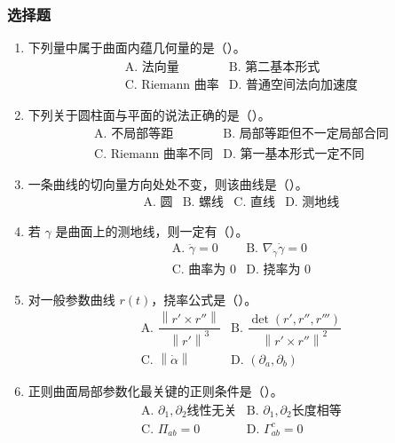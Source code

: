 \documentclass[UTF8,12pt,a4paper]{ctexart}
\newcommand{\norm}[1]{\left\lVert #1\right\rVert}
\begin{document}
\subsubsection*{选择题}
\begin{enumerate}
\item 下列量中属于曲面内蕴几何量的是（\quad）。
\[
\begin{array}{ll}
\text{A. 法向量} & \text{B. 第二基本形式}\\
\text{C. Riemann 曲率} & \text{D. 普通空间法向加速度}
\end{array}
\]

\item 下列关于圆柱面与平面的说法正确的是（\quad）。
\[
\begin{array}{ll}
\text{A. 不局部等距} & \text{B. 局部等距但不一定局部合同}\\
\text{C. Riemann 曲率不同} & \text{D. 第一基本形式一定不同}
\end{array}
\]

\item 一条曲线的切向量方向处处不变，则该曲线是（\quad）。
\[
\begin{array}{llll}
\text{A. 圆} & \text{B. 螺线} & \text{C. 直线} & \text{D. 测地线}
\end{array}
\]

\item 若 $\gamma$ 是曲面上的测地线，则一定有（\quad）。
\[
\begin{array}{ll}
\text{A. }\ddot\gamma=0 & \text{B. }\nabla_{\dot\gamma}\dot\gamma=0\\
\text{C. 曲率为 }0 & \text{D. 挠率为 }0
\end{array}
\]

\item 对一般参数曲线 $r(t)$，挠率公式是（\quad）。
\[
\begin{array}{ll}
\text{A. }\dfrac{\norm{r'\times r''}}{\norm{r'}^3} &
\text{B. }\dfrac{\det(r',r'',r''')}{\norm{r'\times r''}^2}\\
\text{C. }\norm{\dot\alpha} &
\text{D. }(\partial_a,\partial_b)
\end{array}
\]

\item 正则曲面局部参数化最关键的正则条件是（\quad）。
\[
\begin{array}{ll}
\text{A. }\partial_1,\partial_2\text{线性无关} &
\text{B. }\partial_1,\partial_2\text{长度相等}\\
\text{C. }\Pi_{ab}=0 &
\text{D. }\Gamma^c_{ab}=0
\end{array}
\]


\end{enumerate}
\end{document}
